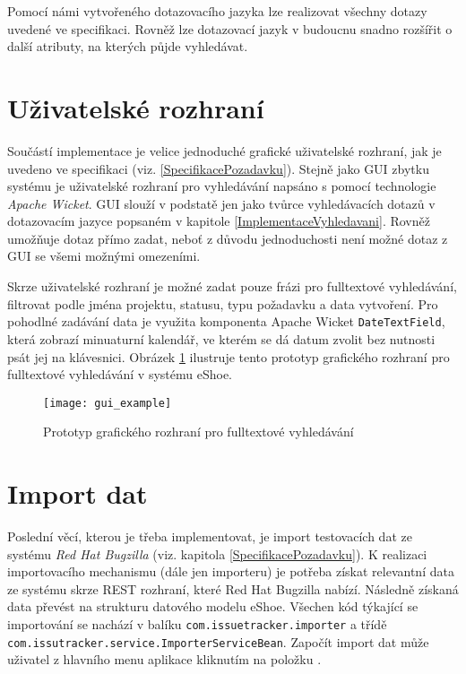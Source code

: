\documentclass[11pt,oneside]{fithesis2}
\begin{document}
Pomocí námi vytvořeného dotazovacího jazyka lze realizovat všechny dotazy uvedené ve specifikaci. Rovněž lze dotazovací jazyk v budoucnu snadno rozšířit o další atributy, na kterých půjde vyhledávat.

\section{Uživatelské rozhraní}
Součástí implementace je velice jednoduché grafické uživatelské rozhraní, jak je uvedeno ve specifikaci (viz. \ref{SpecifikacePozadavku}). Stejně jako GUI zbytku systému je uživatelské rozhraní pro vyhledávání napsáno s pomocí technologie \emph{Apache Wicket}. GUI slouží v podstatě jen jako tvůrce vyhledávacích dotazů v dotazovacím jazyce popsaném v kapitole \ref{ImplementaceVyhledavani}. Rovněž umožňuje dotaz přímo zadat, neboť z důvodu jednoduchosti není možné  dotaz z GUI se všemi možnými omezeními. 

Skrze uživatelské rozhraní je možné zadat pouze frázi pro fulltextové vyhledávání, filtrovat podle jména projektu, statusu, typu požadavku a data vytvoření. Pro pohodlné zadávání data je využita komponenta Apache Wicket \texttt{DateTextField}, která zobrazí minuaturní kalendář, ve kterém se dá datum zvolit bez nutnosti psát jej na klávesnici. Obrázek \ref{GuiExample} ilustruje tento prototyp grafického rozhraní pro fulltextové vyhledávání v systému eShoe.

\begin{figure}[htb]
	\begin{center}
		\texttt{[image: gui\_example]}
	\end{center}
	\caption{Prototyp grafického rozhraní pro fulltextové vyhledávání}	
	\label{GuiExample}
\end{figure}

\section{Import dat}
Poslední věcí, kterou je třeba implementovat, je import testovacích dat ze systému \emph{Red Hat Bugzilla} (viz. kapitola \ref{SpecifikacePozadavku}). K realizaci importovacího mechanismu (dále jen importeru) je potřeba získat relevantní data ze systému skrze REST rozhraní, které Red Hat Bugzilla nabízí. Následně získaná data převést na strukturu datového modelu eShoe. Všechen kód týkající se importování se nachází v balíku \texttt{com.issuetracker.importer} a třídě \texttt{com.issutracker.service.ImporterServiceBean}. Započít import dat může uživatel z hlavního menu aplikace kliknutím na položku . 
\end{document}
